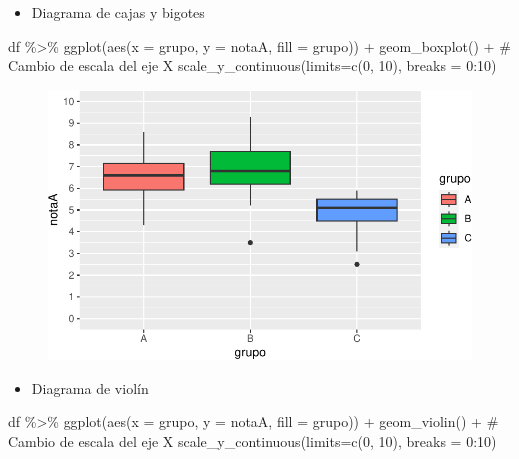 \documentclass[
  a4paper,
]{scrreport}
\newenvironment{Shaded}{\begin{snugshade}}{\end{snugshade}}
\newcommand{\AttributeTok}[1]{\textcolor[rgb]{0.40,0.45,0.13}{#1}}
\newcommand{\CommentTok}[1]{\textcolor[rgb]{0.37,0.37,0.37}{#1}}
\newcommand{\DecValTok}[1]{\textcolor[rgb]{0.68,0.00,0.00}{#1}}
\newcommand{\FunctionTok}[1]{\textcolor[rgb]{0.28,0.35,0.67}{#1}}
\newcommand{\NormalTok}[1]{\textcolor[rgb]{0.00,0.23,0.31}{#1}}
\newcommand{\SpecialCharTok}[1]{\textcolor[rgb]{0.37,0.37,0.37}{#1}}
\providecommand{\tightlist}{%
  \setlength{\itemsep}{0pt}\setlength{\parskip}{0pt}}\usepackage{longtable,booktabs,array}
\theoremstyle{definition}
\theoremstyle{definition}
\theoremstyle{remark}
\begin{document}
\begin{itemize}
\tightlist
\item
  Diagrama de cajas y bigotes
\end{itemize}

\begin{Shaded}
\begin{Highlighting}[]
\NormalTok{df }\SpecialCharTok{\%\textgreater{}\%} \FunctionTok{ggplot}\NormalTok{(}\FunctionTok{aes}\NormalTok{(}\AttributeTok{x =}\NormalTok{ grupo, }\AttributeTok{y =}\NormalTok{ notaA, }\AttributeTok{fill =}\NormalTok{ grupo)) }\SpecialCharTok{+} 
  \FunctionTok{geom\_boxplot}\NormalTok{() }\SpecialCharTok{+}
  \CommentTok{\# Cambio de escala del eje X}
  \FunctionTok{scale\_y\_continuous}\NormalTok{(}\AttributeTok{limits=}\FunctionTok{c}\NormalTok{(}\DecValTok{0}\NormalTok{, }\DecValTok{10}\NormalTok{), }\AttributeTok{breaks =} \DecValTok{0}\SpecialCharTok{:}\DecValTok{10}\NormalTok{)}
\end{Highlighting}
\end{Shaded}

\begin{figure}[H]

{\centering \includegraphics{./08-analisis-estadisticos_files/figure-pdf/unnamed-chunk-47-1.pdf}

}

\end{figure}

\begin{itemize}
\tightlist
\item
  Diagrama de violín
\end{itemize}

\begin{Shaded}
\begin{Highlighting}[]
\NormalTok{df }\SpecialCharTok{\%\textgreater{}\%} \FunctionTok{ggplot}\NormalTok{(}\FunctionTok{aes}\NormalTok{(}\AttributeTok{x =}\NormalTok{ grupo, }\AttributeTok{y =}\NormalTok{ notaA, }\AttributeTok{fill =}\NormalTok{ grupo)) }\SpecialCharTok{+} 
  \FunctionTok{geom\_violin}\NormalTok{() }\SpecialCharTok{+}
  \CommentTok{\# Cambio de escala del eje X}
  \FunctionTok{scale\_y\_continuous}\NormalTok{(}\AttributeTok{limits=}\FunctionTok{c}\NormalTok{(}\DecValTok{0}\NormalTok{, }\DecValTok{10}\NormalTok{), }\AttributeTok{breaks =} \DecValTok{0}\SpecialCharTok{:}\DecValTok{10}\NormalTok{)}
\end{Highlighting}
\end{Shaded}
\end{document}
